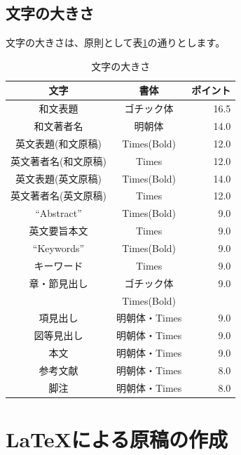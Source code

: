 \documentclass{hissymp}
\begin{document}
\subsection{文字の大きさ}
文字の大きさは、原則として表\ref{table:charsize}の通りとします。

\begin{table}[tbh]
	\begin{center}
	\caption{文字の大きさ}		%
	\label{table:charsize}
	\begin{tabular}[hbt]{c c r}
	\hline
	\bf 文字 & \bf 書体 & \bf ポイント\\
	\hline
	和文表題 & ゴチック体 & 16.5\\
	和文著者名 & 明朝体 & 14.0\\
	英文表題(和文原稿) & Times(Bold) & 12.0\\
	英文著者名(和文原稿) & Times & 12.0\\
	英文表題(英文原稿) & Times(Bold) & 14.0\\
	英文著者名(英文原稿) & Times & 12.0\\
	``Abstract'' & Times(Bold) & 9.0\\
	英文要旨本文 & Times & 9.0\\
	``Keywords'' & Times(Bold) & 9.0 \\
	キーワード & Times & 9.0\\ \vspace{-0.7mm}
	章・節見出し & ゴチック体 & 9.0\\
	& Times(Bold) & \\
	項見出し & 明朝体・Times & 9.0\\
	図等見出し & 明朝体・Times & 9.0\\
	本文 & 明朝体・Times & 9.0\\
	参考文献 & 明朝体・Times & 8.0\\ \vspace{-0.7mm}
	脚注 & 明朝体・Times &  8.0\\
	\hline
	\end{tabular}
	\end{center}
\end{table}



\section{\LaTeX{}による原稿の作成}
\end{document}

